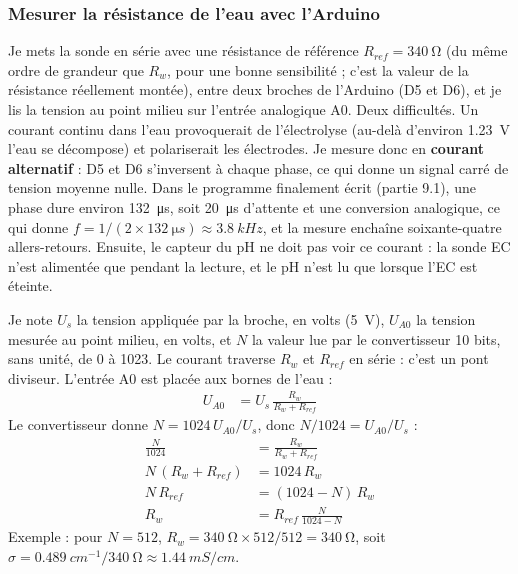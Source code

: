 \subsubsection*{Mesurer la résistance de l'eau avec l'Arduino}

Je mets la sonde en série avec une résistance de référence $R_{ref} = \qty{340}{\ohm}$ (du même ordre de grandeur que $R_w$, pour une bonne sensibilité ; c'est la valeur de la résistance réellement montée), entre deux broches de l'Arduino (D5 et D6), et je lis la tension au point milieu sur l'entrée analogique A0. Deux difficultés. Un courant continu dans l'eau provoquerait de l'électrolyse (au-delà d'environ \qty{1,23}{V} l'eau se décompose) et polariserait les électrodes. Je mesure donc en \textbf{courant alternatif} : D5 et D6 s'inversent à chaque phase, ce qui donne un signal carré de tension moyenne nulle. Dans le programme finalement écrit (partie 9.1), une phase dure environ \qty{132}{\micro s}, soit \qty{20}{\micro s} d'attente et une conversion analogique, ce qui donne $f = 1/(2 \times \qty{132}{\micro s}) \approx \qty{3,8}{kHz}$, et la mesure enchaîne soixante-quatre allers-retours. Ensuite, le capteur du pH ne doit pas voir ce courant : la sonde EC n'est alimentée que pendant la lecture, et le pH n'est lu que lorsque l'EC est éteinte.

\begin{demonstration}
Je note $U_s$ la tension appliquée par la broche, en volts (\qty{5}{V}), $U_{A0}$ la tension mesurée au point milieu, en volts, et $N$ la valeur lue par le convertisseur 10 bits, sans unité, de 0 à 1023. Le courant traverse $R_w$ et $R_{ref}$ en série : c'est un pont diviseur. L'entrée A0 est placée aux bornes de l'eau :
\begin{align*}
U_{A0} &= U_s\,\frac{R_w}{R_w + R_{ref}}
\end{align*}
Le convertisseur donne $N = 1024\,U_{A0}/U_s$, donc $N/1024 = U_{A0}/U_s$ :
\begin{align*}
\frac{N}{1024} &= \frac{R_w}{R_w + R_{ref}}\\
N\,(R_w + R_{ref}) &= 1024\,R_w\\
N\,R_{ref} &= (1024 - N)\,R_w\\
R_w &= R_{ref}\,\frac{N}{1024 - N}
\end{align*}
Exemple : pour $N = 512$, $R_w = \qty{340}{\ohm} \times 512/512 = \qty{340}{\ohm}$, soit $\sigma = \qty{0,489}{cm^{-1}}/\qty{340}{\ohm} \approx \qty{1,44}{mS/cm}$.
\end{demonstration}

